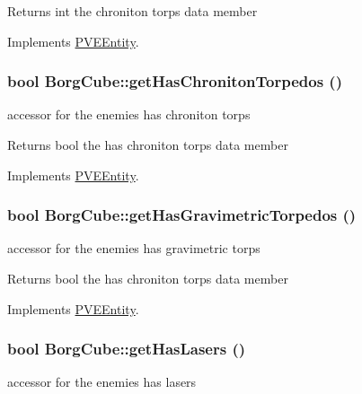 \begin{DoxyReturn}{Returns}
int the chroniton torps data member 
\end{DoxyReturn}


Implements \hyperlink{classPVEEntity}{PVEEntity}.

\hypertarget{classBorgCube_aea74a439176f217e25c9fb37015b9088}{
\subsubsection[{getHasChronitonTorpedos}]{\setlength{\rightskip}{0pt plus 5cm}bool BorgCube::getHasChronitonTorpedos ()}}
\label{d2/d93/classBorgCube_aea74a439176f217e25c9fb37015b9088}
accessor for the enemies has chroniton torps

\begin{DoxyReturn}{Returns}
bool the has chroniton torps data member 
\end{DoxyReturn}


Implements \hyperlink{classPVEEntity}{PVEEntity}.

\hypertarget{classBorgCube_abb0288f7ec08d8acb2aa0f3be2e4ada4}{
\subsubsection[{getHasGravimetricTorpedos}]{\setlength{\rightskip}{0pt plus 5cm}bool BorgCube::getHasGravimetricTorpedos ()}}
\label{d2/d93/classBorgCube_abb0288f7ec08d8acb2aa0f3be2e4ada4}
accessor for the enemies has gravimetric torps

\begin{DoxyReturn}{Returns}
bool the has chroniton torps data member 
\end{DoxyReturn}


Implements \hyperlink{classPVEEntity}{PVEEntity}.

\hypertarget{classBorgCube_a780ad07deecda3bb7a97ed62365b926f}{
\subsubsection[{getHasLasers}]{\setlength{\rightskip}{0pt plus 5cm}bool BorgCube::getHasLasers ()}}
\label{d2/d93/classBorgCube_a780ad07deecda3bb7a97ed62365b926f}
accessor for the enemies has lasers

